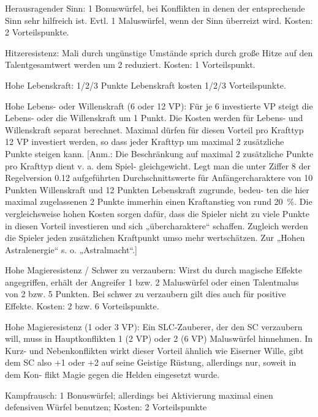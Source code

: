 \begin{description}
\item{Herausragender Sinn:} 1 Bonuswürfel, bei Konflikten in denen der entsprechende Sinn sehr hilfreich ist. Evtl. 1 Maluswürfel, wenn der Sinn überreizt wird. Kosten: 2 Vorteilspunkte.

\item{Hitzeresistenz:} Mali durch ungünstige Umstände sprich durch große Hitze auf den Talentgesamtwert werden um 2 reduziert. Kosten: 1 Vorteilspunkt.

\item{Hohe Lebenskraft:} 1/2/3 Punkte Lebenskraft kosten 1/2/3 Vorteilspunkte.

\item{Hohe Lebens- oder Willenskraft (6 oder 12 VP):} Für je 6 investierte VP steigt die Lebens- oder die Willenskraft um 1 Punkt. Die Kosten werden für Lebens- und Willenskraft separat berechnet. Maximal dürfen für diesen Vorteil pro Krafttyp 12 VP investiert werden, so dass jeder Krafttyp um maximal 2 zusätzliche Punkte steigen kann. [Anm.: Die Beschränkung auf maximal 2 zusätzliche Punkte pro Krafttyp dient v. a. dem Spiel- gleichgewicht. Legt man die unter Ziffer 8 der Regelversion 0.12 aufgeführten Durchschnittswerte für Anfängercharaktere von 10 Punkten Willenskraft und 12 Punkten Lebenskraft zugrunde, bedeu- ten die hier maximal zugelassenen 2 Punkte immerhin einen Kraftanstieg von rund 20~\%. Die vergleichsweise hohen Kosten sorgen dafür, dass die Spieler nicht zu viele Punkte in diesen Vorteil investieren und sich „übercharaktere“ schaffen. Zugleich werden die Spieler jeden zusätzlichen Kraftpunkt umso mehr wertschätzen. Zur „Hohen Astralenergie“ s. o. „Astralmacht“.]

\item{Hohe Magieresistenz / Schwer zu verzaubern:} Wirst du durch magische Effekte angegriffen, erhält der Angreifer 1 bzw. 2 Maluswürfel oder einen Talentmalus von 2 bzw. 5 Punkten. Bei schwer zu verzaubern gilt dies auch für positive Effekte. Kosten: 2 bzw. 6 Vorteilspunkte.

\item{Hohe Magieresistenz (1 oder 3 VP):} Ein SLC-Zauberer, der den SC verzaubern will, muss in Hauptkonflikten 1 (2 VP) oder 2 (6 VP) Maluswürfel hinnehmen. In Kurz- und Nebenkonflikten wirkt dieser Vorteil ähnlich wie Eiserner Wille, gibt dem SC also +1 oder +2 auf seine Geistige Rüstung, allerdings nur, soweit in dem Kon- flikt Magie gegen die Helden eingesetzt wurde.

\item{Kampfrausch:} 1 Bonuswürfel; allerdings bei Aktivierung maximal einen defensiven Würfel benutzen; Kosten: 2 Vorteilspunkte


\end{description}
